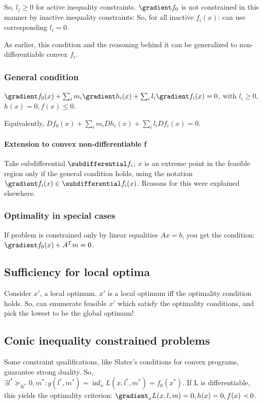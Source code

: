 \documentclass[oneside, article]{memoir}
\begin{document}
So, $l_j \geq 0$ for active inequality constraints. $\gradient f_0$ is not constrained in this manner by inactive inequality constraints: So, for all inactive $f_i(x)$: can use corresponding $l_i = 0$.

As earlier, this condition and the reasoning behind it can be generalized to non-differentiable convex $f_i$.

\subsubsection{General condition}
$\gradient f_0(x) + \sum_i m_i \gradient h_i(x) + \sum_i l_i \gradient f_i(x) = 0$, with $l_i \geq 0$, $h(x) = 0, f(x) \leq 0$.

Equivalently, $D f_0(x) + \sum_i m_i Dh_i(x) + \sum_i l_i Df_i(x) = 0$. 

\paragraph{Extension to convex non-differentiable f}
Take subdifferential $\subdifferential f_i$; $x$ is an extreme point in the feasible region only if the general condition holds, using the notation $\gradient f_i(x) \in \subdifferential f_i(x)$. Reasons for this were explained elsewhere.

\subsubsection{Optimality in special cases}
If problem is constrained only by linear equalities $Ax = b$, you get the condition: $\gradient f_0(x) + A^{T}m = 0$.

\subsection{Sufficiency for local optima}
Consider $x'$, a local optimum. $x'$ is a local optimum iff the optimality condition holds. So, can enumerate feasible $x'$ which satisfy the optimality conditions, and pick the lowest to be the global optimum!


\subsection{Conic inequality constrained problems}
Some constraint qualifications, like Slater's conditions for convex programs, guarantee strong duality. So, $\exists l^{*} \succeq_{K^{*}} 0, m^{*}: g(l^{*}, m^{*}) = \inf_x L(x, l^{*}, m^{*}) = f_0(x^{*})$. If L is differentiable, this yields the optimality criterion: $\gradient_x L(x, l, m) = 0, h(x) = 0, f(x) \prec 0$.
\end{document}
